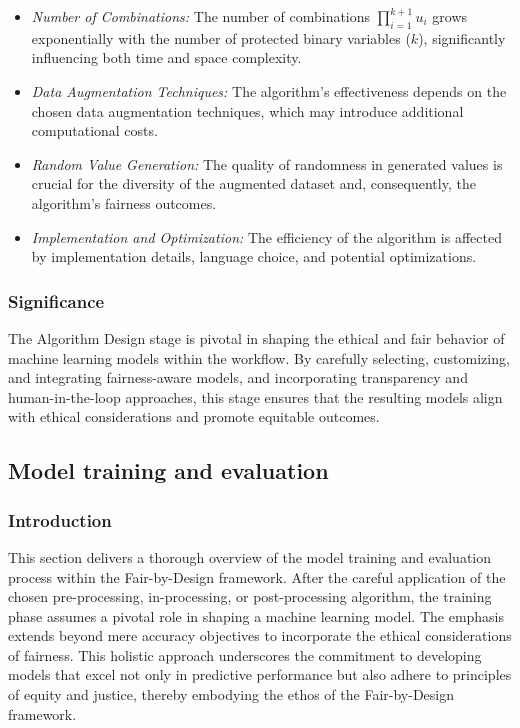\begin{itemize}
    \item \emph{Number of Combinations:} The number of combinations \(\prod_{i=1}^{k+1} u_i\) grows exponentially with the number of protected binary variables (\(k\)), significantly influencing both time and space complexity.
    
    \item \emph{Data Augmentation Techniques:} The algorithm's effectiveness depends on the chosen data augmentation techniques, which may introduce additional computational costs.
    
    \item \emph{Random Value Generation:} The quality of randomness in generated values is crucial for the diversity of the augmented dataset and, consequently, the algorithm's fairness outcomes.
    
    \item \emph{Implementation and Optimization:} The efficiency of the algorithm is affected by implementation details, language choice, and potential optimizations.
\end{itemize}

\subsubsection{Significance}

The Algorithm Design stage is pivotal in shaping the ethical and fair behavior of machine learning models within the workflow. By carefully selecting, customizing, and integrating fairness-aware models, and incorporating transparency and human-in-the-loop approaches, this stage ensures that the resulting models align with ethical considerations and promote equitable outcomes.

\subsection{Model training and evaluation}
\label{subsection:model-training}

\subsubsection{Introduction}

This section delivers a thorough overview of the model training and evaluation process within the Fair-by-Design framework. After the careful application of the chosen pre-processing, in-processing, or post-processing algorithm, the training phase assumes a pivotal role in shaping a machine learning model. The emphasis extends beyond mere accuracy objectives to incorporate the ethical considerations of fairness. This holistic approach underscores the commitment to developing models that excel not only in predictive performance but also adhere to principles of equity and justice, thereby embodying the ethos of the Fair-by-Design framework.


